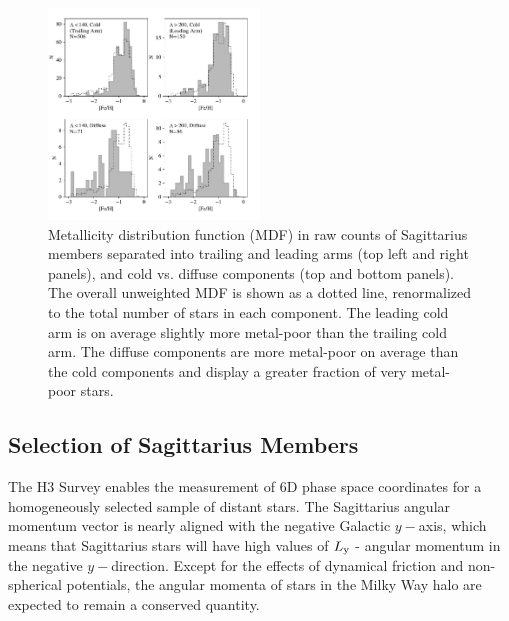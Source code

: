 \documentclass[twocolumn,tighten,twocolappendix]{aastex63}
\newcommand{\sgr}{Sagittarius}
\newcommand{\Ly}{L_{\rm y}}
\begin{document}
\begin{CJK*}{UTF8}{gbsn}
\begin{figure}
\includegraphics[width=0.5\textwidth]{mdf_by_vlam.pdf}
\caption{Metallicity distribution function (MDF) in raw counts of \sgr{} members separated into trailing and leading arms (top left and right panels), and cold vs. diffuse components (top and bottom panels).  The overall unweighted MDF is shown as a dotted line, renormalized to the total number of stars in each component.  The leading cold arm is on average slightly more metal-poor than the trailing cold arm.  The diffuse components are more metal-poor on average than the cold components and display a greater fraction of very metal-poor stars.
\label{fig:mdfvel}}
\end{figure}


\subsection{Selection of Sagittarius Members}
\label{sec:selection}

The H3 Survey enables the measurement of 6D phase space coordinates for a homogeneously selected sample of distant stars.  The \sgr{} angular momentum vector is nearly aligned with the negative Galactic $y-$axis, which means that \sgr{} stars will have high values of $\Ly$ - angular momentum in the negative $y-$direction.  Except for the effects of dynamical friction and non-spherical potentials, the angular momenta of stars in the Milky Way halo are expected to remain a conserved quantity.


\end{CJK*}
\end{document}

